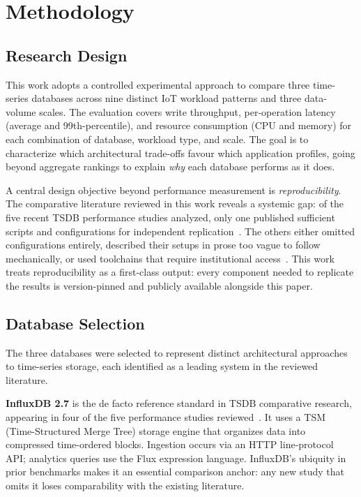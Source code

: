 \section{Methodology}
\label{sec:methodology}

\subsection{Research Design}

This work adopts a controlled experimental approach to compare three time-series databases
across nine distinct IoT workload patterns and three data-volume scales. The evaluation covers
write throughput, per-operation latency (average and 99th-percentile), and resource consumption
(CPU and memory) for each combination of database, workload type, and scale. The goal is to
characterize which architectural trade-offs favour which application profiles, going beyond
aggregate rankings to explain \textit{why} each database performs as it does.

A central design objective beyond performance measurement is \textit{reproducibility}.
The comparative literature reviewed in this work reveals a systemic gap: of the five recent
TSDB performance studies analyzed, only one published sufficient scripts and configurations
for independent replication~\citep{pereira2023mulletbench}. The others either omitted
configurations entirely, described their setups in prose too vague to follow mechanically,
or used toolchains that require institutional access~\citep{shah2022performance,naqvi2017influxdb,
lima2024avaliando,wang2023iotdb}. This work treats reproducibility as a first-class output:
every component needed to replicate the results is version-pinned and publicly available
alongside this paper.

\subsection{Database Selection}

The three databases were selected to represent distinct architectural approaches to
time-series storage, each identified as a leading system in the reviewed literature.

\textbf{InfluxDB 2.7} is the de facto reference standard in TSDB comparative research,
appearing in four of the five performance studies reviewed~\citep{naqvi2017influxdb,
shah2022performance,lima2024avaliando,wang2023iotdb}. It uses a TSM (Time-Structured Merge
Tree) storage engine that organizes data into compressed time-ordered blocks. Ingestion
occurs via an HTTP line-protocol API; analytics queries use the Flux expression language.
InfluxDB's ubiquity in prior benchmarks makes it an essential comparison anchor: any new
study that omits it loses comparability with the existing literature.

